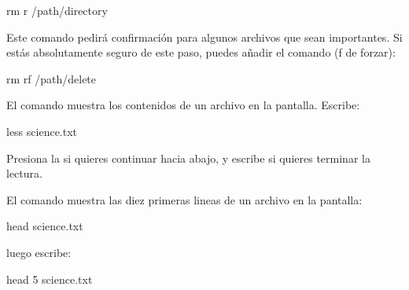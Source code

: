 \documentclass[letterpaper,10pt,english]{jupyterBook}
\begin{document}
\begin{sphinxVerbatim}[commandchars=\\\{\}]
\PYGZdl{} rm \PYGZhy{}r /path/directory
\end{sphinxVerbatim}

\sphinxAtStartPar
Este comando pedirá confirmación para algunos archivos que sean importantes. Si estás absolutamente seguro de este paso, puedes añadir el comando  (f de forzar):

\begin{sphinxVerbatim}[commandchars=\\\{\}]
\PYGZdl{} rm \PYGZhy{}rf /path/delete
\end{sphinxVerbatim}



\begin{DUlineblock}{0em}
\item[] 
\end{DUlineblock}

\sphinxAtStartPar
{}

\sphinxAtStartPar
El comando  muestra los contenidos de un archivo en la pantalla. Escribe:

\begin{sphinxVerbatim}[commandchars=\\\{\}]
\PYGZdl{} less science.txt
\end{sphinxVerbatim}

\sphinxAtStartPar
Presiona la  si quieres continuar hacia abajo, y escribe \sphinxcode{\sphinxupquote{{[}q{]}}} si quieres terminar la lectura.

\sphinxAtStartPar
{}

\sphinxAtStartPar
El comando  muestra las diez primeras lineas de un archivo en la pantalla:

\begin{sphinxVerbatim}[commandchars=\\\{\}]
\PYGZdl{} head science.txt
\end{sphinxVerbatim}

\sphinxAtStartPar
luego escribe:

\begin{sphinxVerbatim}[commandchars=\\\{\}]
\PYGZdl{} head \PYGZhy{}5 science.txt
\end{sphinxVerbatim}
\end{document}
